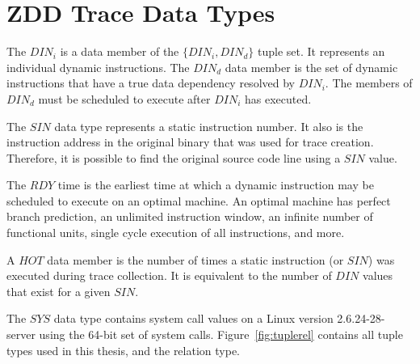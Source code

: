 \documentclass[defaultstyle,11pt]{thesis}
\begin{document}




\appendix

\chapter{ZDD Trace Data Types}
\label{appdx:tracetypes}

The $DIN_i$ is a data member of the $\{DIN_i,DIN_d\}$ tuple set.  It
represents an individual dynamic instructions.  The $DIN_d$ data member
is the set of dynamic instructions that have a true data dependency
resolved by $DIN_i$.  The members of $DIN_d$ must be scheduled to
execute after $DIN_i$ has executed.

The $SIN$ data type represents a static instruction number.  It also
is the instruction address in the original binary that was used for
trace creation.  Therefore, it is possible to find the original source
code line using a $SIN$ value.

The $RDY$ time is the earliest time at which a dynamic instruction may
be scheduled to execute on an optimal machine.  An optimal machine has
perfect branch prediction, an unlimited instruction window, an
infinite number of functional units, single cycle execution of all
instructions, and more.

A $HOT$ data member is the number of times a static instruction (or
$SIN$) was executed during trace collection.  It is equivalent to the
number of $DIN$ values that exist for a given $SIN$.

The $SYS$ data type contains system call values on a Linux version
2.6.24-28-server using the 64-bit set of system calls.
Figure~\ref{fig:tuplerel} contains all tuple types used in this
thesis, and the relation type.
\end{document}
